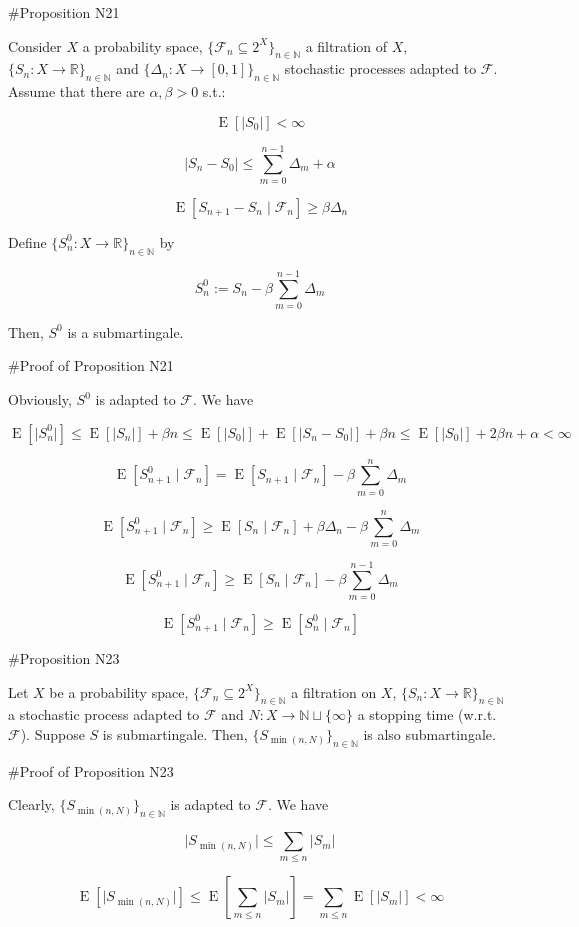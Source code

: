 \documentclass[a4paper]{article}
\DeclareMathOperator{\E}{E}
\newcommand{\Nats}{\mathbb{N}}
\newcommand{\Reals}{\mathbb{R}}
\newcommand{\Sq}[2]{\{#1\}_{#2 \in \Nats}}
\newcommand{\Sqn}[1]{\Sq{#1}{n}}
\newcommand{\Abs}[1]{\lvert #1 \rvert}
\newcommand{\F}{\mathcal{F}}
\begin{document}
\#Proposition N21

Consider ${X}$ a probability space, ${\{\F_n \subseteq 2^X\}_{n \in \Nats}}$ a filtration of ${X}$, ${\{S_n:X \rightarrow \Reals\}_{n \in \Nats}}$ and ${\{\Delta_n:X \rightarrow [0,1]\}_{n \in \Nats}}$ stochastic processes adapted to ${\F}$. Assume that there are ${\alpha,\beta > 0}$ s.t.:

$$\E[\Abs{S_0}] < \infty$$

$$\Abs{S_{n}-S_0} \leq \sum_{m=0}^{n-1} \Delta_m + \alpha$$

$$\E[S_{n+1} - S_n \mid \F_n] \geq \beta \Delta_n$$

Define ${\Sqn{S^0_n: X \rightarrow \Reals}}$ by

$$S^0_n := S_n - \beta \sum_{m=0}^{n-1} \Delta_m$$
 
Then, ${S^0}$ is a submartingale.

\#Proof of Proposition N21

Obviously, ${S^0}$ is adapted to ${\F}$. We have

$$\E[\Abs{S^0_{n}}] \leq \E[\Abs{S_n}] + \beta n \leq \E[\Abs{S_0}] + \E[\Abs{S_n - S_0}] + \beta n \leq \E[\Abs{S_0}] + 2\beta n + \alpha < \infty$$

$$\E[S^0_{n+1} \mid \F_n] = \E[S_{n+1} \mid \F_n] - \beta \sum_{m = 0}^{n} \Delta_m$$

$$\E[S^0_{n+1} \mid \F_n] \geq \E[S_{n} \mid \F_n] + \beta \Delta_n - \beta \sum_{m = 0}^{n} \Delta_m$$

$$\E[S^0_{n+1} \mid \F_n] \geq \E[S_{n} \mid \F_n] - \beta \sum_{m = 0}^{n - 1} \Delta_m$$

$$\E[S^0_{n+1} \mid \F_n] \geq \E[S^0_{n} \mid \F_n]$$

\#Proposition N23

Let ${X}$ be a probability space, ${\Sqn{\F_n \subseteq 2^X}}$ a filtration on ${X}$, ${\Sqn{S_n: X \rightarrow \Reals}}$ a stochastic process adapted to ${\F}$ and ${N: X \rightarrow \Nats \sqcup \{\infty\}}$ a stopping time (w.r.t. ${\F}$). Suppose ${S}$ is submartingale. Then, ${\Sqn{S_{\min(n,N)}}}$ is also submartingale.

\#Proof of Proposition N23

Clearly, ${\Sqn{S_{\min(n,N)}}}$ is adapted to ${\F}$. We have

$$\Abs{S_{\min(n,N)}} \leq \sum_{m \leq n} \Abs{S_m}$$

$$\E[\Abs{S_{\min(n,N)}}] \leq \E[\sum_{m \leq n} \Abs{S_m}] = \sum_{m \leq n} \E[\Abs{S_m}] < \infty$$
\end{document}
